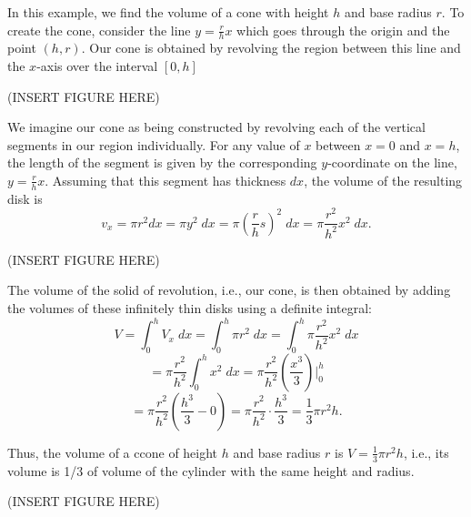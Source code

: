 \documentclass{ximera}
\begin{document}
\begin{example}
In this example, we find the volume of a cone with height $h$ and base radius $r$.
To create the cone, consider the line $y = \frac{r}{h} x$ which goes through the origin and the point $(h,r)$.
Our cone is obtained by revolving the region between this line and the $x$-axis over the interval $[0,h]$

(INSERT FIGURE HERE)

We imagine our cone as being constructed by revolving each of the vertical segments in our region individually.
For any value of $x$ between $x = 0$ and $x = h$, the length of the segment is given by the corresponding $y$-coordinate
on the line, $y = \frac{r}{h} x$. Assuming that this segment has thickness $dx$, the volume of the resulting disk is 
\[
v_x = \pi r^2 dx = \pi y^2 \; dx = \pi \left(\frac{r}{h} s\right)^2 \; dx = \pi \frac{r^2}{h^2} x^2 \; dx.
\]

(INSERT FIGURE HERE)

The volume of the solid of revolution, i.e., our cone, is then obtained by adding the volumes of these infinitely thin disks using a definite integral:
\[
V = \int_0^h V_x \; dx = \int_0^h \pi r^2 \; dx = \int_0^h \pi \frac{r^2}{h^2} x^2 \; dx 
\]
\[
= \pi \frac{r^2}{h^2}\int_0^h  x^2 \; dx = \pi \frac{r^2}{h^2} \left(\frac{x^3}{3}\right)\bigg|_0^h 
\]
\[
= \pi \frac{r^2}{h^2} \left(\frac{h^3}{3} - 0\right) = \pi \frac{r^2}{h^2} \cdot \frac{h^3}{3} = \frac13 \pi r^2 h.
\]

Thus, the volume of a ccone of height $h$ and base radius $r$ is $V = \frac13 \pi r^2 h$, i.e., its volume is 1/3 of 
volume of the cylinder with the same height and radius.

(INSERT FIGURE HERE)

\end{example}
\end{document}
